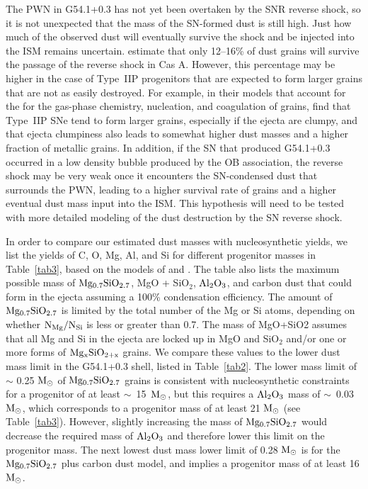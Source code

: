 \documentclass{emulateapj}
\begin{document}
The PWN in G54.1+0.3 has not yet been overtaken by the SNR reverse shock, so it is not unexpected that the mass of the SN-formed dust is still high. Just how much of the observed dust will eventually survive the shock and be injected into the ISM remains uncertain. \citet{micelotta16} estimate that only 12--16\% of dust grains will survive the passage of the reverse shock in Cas A. However, this percentage may be higher in the case of Type~IIP progenitors that are expected to form larger grains that are not as easily destroyed. For example, in their models that account for the for the gas-phase chemistry, nucleation, and coagulation of grains, \citet{sarangi15} find that Type~IIP SNe tend to form larger grains, especially if the ejecta are clumpy, and that ejecta clumpiness also leads to somewhat higher dust masses and a higher fraction of metallic grains. In addition, if the SN that produced G54.1+0.3 occurred in a low density bubble produced by the OB association, the reverse shock may be very weak once it encounters the SN-condensed dust that surrounds the PWN, leading to a higher survival rate of grains and a higher eventual dust mass input into the ISM. This hypothesis will need to be tested with more detailed modeling of the dust destruction by the SN reverse shock.


In order to compare our estimated dust masses with nucleosynthetic yields, we list the yields of C, O, Mg, Al, and Si for different progenitor masses in Table~\ref{tab3}, based on the models of \citet{woosley07} and \citet{sukhbold16}. The table also lists the maximum possible mass of $\rm Mg_{0.7}SiO_{2.7}$, MgO + SiO$_2$,  $\rm Al_2O_3$, and carbon dust that could form in the ejecta assuming a 100\% condensation efficiency. The amount of $\rm Mg_{0.7}SiO_{2.7}$ is limited by the total number of the Mg or Si atoms, depending on whether $\rm N_{Mg}/N_{Si}$ is less or greater than 0.7.
The mass of MgO+SiO2 assumes that all Mg and Si in the ejecta are locked up in MgO and SiO$_2$ and/or one or more forms of $\rm Mg_xSiO_{2+x}$ grains. We compare these values to the lower dust mass limit in the G54.1+0.3 shell, listed in Table~\ref{tab2}. The lower mass limit of $\sim$ 0.25 $\rm M_{\odot}$ of $\rm Mg_{0.7}SiO_{2.7}$ grains is consistent with nucleosynthetic constraints for a progenitor of at least $\sim$~15~$\rm M_{\odot}$, but this requires a $\rm Al_2O_3$  mass of $\sim$~0.03 $\rm M_{\odot}$, which corresponds to a progenitor mass of at least 21 $\rm M_{\odot}$ (see Table~\ref{tab3}). However, slightly increasing the mass of $\rm Mg_{0.7}SiO_{2.7}$ would decrease the required mass of $\rm Al_2O_3$ and therefore lower this limit on the progenitor mass. The next lowest dust mass lower limit of 0.28 $\rm M_{\odot}$ is for the $\rm Mg_{0.7}SiO_{2.7}$ plus carbon dust model, and implies a progenitor mass of at least 16 $\rm M_{\odot}$. 
\end{document}
